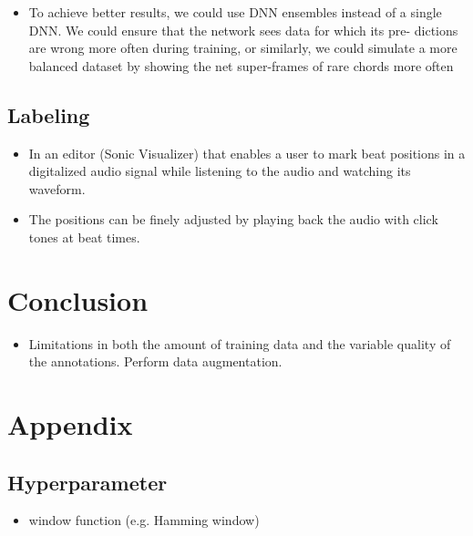 \documentclass{scrartcl}
\begin{document}
\begin{itemize}
\item To achieve better results, we could use DNN ensembles instead of a single DNN. We could ensure that the network sees data for which its pre- dictions are wrong more often during training, or similarly, we could simulate a more balanced dataset by showing the net super-frames of rare chords more often \cite{Korzeniowski2016}
\end{itemize}



\subsection{Labeling}

\begin{itemize}
\item In an editor (Sonic Visualizer) that enables a user to mark beat positions in a digitalized audio signal while listening to the audio and watching its waveform.
\item The positions can be finely adjusted by playing back the audio with click tones at beat times.
\end{itemize}


\section{Conclusion}

\begin{itemize}
\item Limitations in both the amount of training data and the variable quality of the annotations. Perform data augmentation. 
\end{itemize}

\newpage

\section{Appendix}

\subsection{Hyperparameter} 
\begin{itemize}
\item window function (e.g. Hamming window)
\end{itemize}

\newpage 


\end{document}

